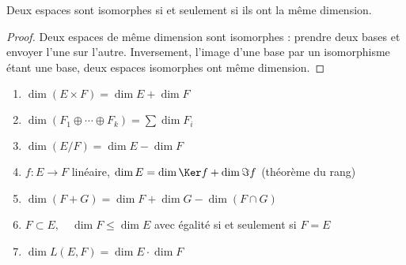 \begin{thm}
Deux espaces sont isomorphes si et seulement si ils ont la même dimension.
\end{thm}

\begin{proof}
Deux espaces de même dimension sont isomorphes : prendre deux bases et envoyer l'une sur l'autre. Inversement, l'image d'une base par un isomorphisme étant une base, deux espaces isomorphes ont même dimension.
\end{proof}

\begin{thm}
\begin{enumerate}
\item {} $\dim(E \times F) = \dim E + \dim F$
\item {} $\dim(F_1 \oplus \cdots \oplus F_k) = \sum \dim F_i$
\item {} $\dim(E/F) = \dim E - \dim F$
\item {} $f : E \rightarrow F$ linéaire, $\dim E = \dim \Ker f + \dim \Im f$ (théorème du rang)
\item {} $\dim(F + G) = \dim F + \dim G - \dim(F \cap G)$
\item $F \subset E, \quad \dim F \leq \dim E$ avec égalité si et seulement si $F = E$
\item {} $\dim L(E,F) = \dim E \cdot \dim F$
\end{enumerate}
\end{thm}

